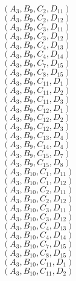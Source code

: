 \documentclass[14pt]{article}
\begin{document}
    $({A}_{3}, {B}_{9}, {C}_{2}, {D}_{11}) $ \\ 
    $({A}_{3}, {B}_{9}, {C}_{2}, {D}_{12}) $ \\ 
    $({A}_{3}, {B}_{9}, {C}_{3}, {D}_{11}) $ \\ 
    $({A}_{3}, {B}_{9}, {C}_{3}, {D}_{12}) $ \\ 
    $({A}_{3}, {B}_{9}, {C}_{4}, {D}_{13}) $ \\ 
    $({A}_{3}, {B}_{9}, {C}_{4}, {D}_{14}) $ \\ 
    $({A}_{3}, {B}_{9}, {C}_{7}, {D}_{15}) $ \\ 
    $({A}_{3}, {B}_{9}, {C}_{8}, {D}_{15}) $ \\ 
    $({A}_{3}, {B}_{9}, {C}_{11}, {D}_{1}) $ \\ 
    $({A}_{3}, {B}_{9}, {C}_{11}, {D}_{2}) $ \\ 
    $({A}_{3}, {B}_{9}, {C}_{11}, {D}_{3}) $ \\ 
    $({A}_{3}, {B}_{9}, {C}_{12}, {D}_{1}) $ \\ 
    $({A}_{3}, {B}_{9}, {C}_{12}, {D}_{2}) $ \\ 
    $({A}_{3}, {B}_{9}, {C}_{12}, {D}_{3}) $ \\ 
    $({A}_{3}, {B}_{9}, {C}_{13}, {D}_{4}) $ \\ 
    $({A}_{3}, {B}_{9}, {C}_{14}, {D}_{4}) $ \\ 
    $({A}_{3}, {B}_{9}, {C}_{15}, {D}_{7}) $ \\ 
    $({A}_{3}, {B}_{9}, {C}_{15}, {D}_{8}) $ \\ 
    $({A}_{3}, {B}_{10}, {C}_{1}, {D}_{11}) $ \\ 
    $({A}_{3}, {B}_{10}, {C}_{1}, {D}_{12}) $ \\ 
    $({A}_{3}, {B}_{10}, {C}_{2}, {D}_{11}) $ \\ 
    $({A}_{3}, {B}_{10}, {C}_{2}, {D}_{12}) $ \\ 
    $({A}_{3}, {B}_{10}, {C}_{3}, {D}_{11}) $ \\ 
    $({A}_{3}, {B}_{10}, {C}_{3}, {D}_{12}) $ \\ 
    $({A}_{3}, {B}_{10}, {C}_{4}, {D}_{13}) $ \\ 
    $({A}_{3}, {B}_{10}, {C}_{4}, {D}_{14}) $ \\ 
    $({A}_{3}, {B}_{10}, {C}_{7}, {D}_{15}) $ \\ 
    $({A}_{3}, {B}_{10}, {C}_{8}, {D}_{15}) $ \\ 
    $({A}_{3}, {B}_{10}, {C}_{11}, {D}_{1}) $ \\ 
    $({A}_{3}, {B}_{10}, {C}_{11}, {D}_{2}) $ \\ 
\end{document}
